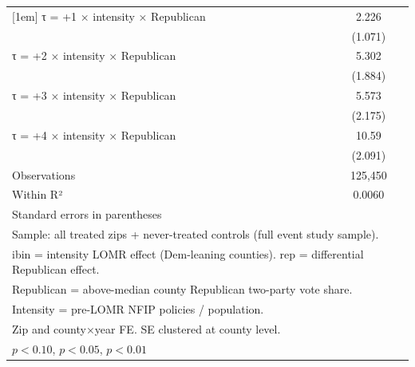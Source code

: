 \begin{table}[htbp]
\begin{tabular}{l*{1}{c}}
[1em]
τ = +1 × intensity × Republican&       2.226\sym{**} \\
                    &     (1.071)         \\
[1em]
τ = +2 × intensity × Republican&       5.302\sym{***}\\
                    &     (1.884)         \\
[1em]
τ = +3 × intensity × Republican&       5.573\sym{**} \\
                    &     (2.175)         \\
[1em]
τ = +4 × intensity × Republican&       10.59\sym{***}\\
                    &     (2.091)         \\
\hline
Observations        &     125,450         \\
Within R²           &      0.0060         \\
\hline\hline
\multicolumn{2}{l}{\footnotesize Standard errors in parentheses}\\
\multicolumn{2}{l}{\footnotesize Sample: all treated zips + never-treated controls (full event study sample).}\\
\multicolumn{2}{l}{\footnotesize ibin = intensity LOMR effect (Dem-leaning counties). rep = differential Republican effect.}\\
\multicolumn{2}{l}{\footnotesize Republican = above-median county Republican two-party vote share.}\\
\multicolumn{2}{l}{\footnotesize Intensity = pre-LOMR NFIP policies / population.}\\
\multicolumn{2}{l}{\footnotesize Zip and county×year FE. SE clustered at county level.}\\
\multicolumn{2}{l}{\footnotesize \sym{*} \(p<0.10\), \sym{**} \(p<0.05\), \sym{***} \(p<0.01\)}\\
\end{tabular}
\end{table}
